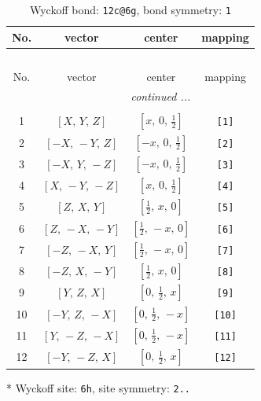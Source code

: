 \documentclass[fleqn,8pt]{jsarticle}
\begin{document}
\begin{longtable}{cccc}
\caption{Wyckoff bond: {\tt 12c@6g}, bond symmetry: {\tt 1}}
 \\
 \hline \hline
No. & vector & center & mapping \\ \hline \endfirsthead

\multicolumn{3}{l}{\tablename\ \thetable{}} \\
 \hline \hline
No. & vector & center & mapping \\ \hline \endhead

 \hline \hline
\multicolumn{3}{r}{\footnotesize\it continued ...} \\ \endfoot

 \hline \hline
\multicolumn{3}{r}{} \\ \endlastfoot

1 & $\left[ X,\, Y,\, Z \right]$ & $\left[ x,\, 0,\, \frac{1}{2} \right]$ & {\tt [1]} \\ \hline
2 & $\left[ - X,\, - Y,\, Z \right]$ & $\left[ - x,\, 0,\, \frac{1}{2} \right]$ & {\tt [2]} \\ \hline
3 & $\left[ - X,\, Y,\, - Z \right]$ & $\left[ - x,\, 0,\, \frac{1}{2} \right]$ & {\tt [3]} \\ \hline
4 & $\left[ X,\, - Y,\, - Z \right]$ & $\left[ x,\, 0,\, \frac{1}{2} \right]$ & {\tt [4]} \\ \hline
5 & $\left[ Z,\, X,\, Y \right]$ & $\left[ \frac{1}{2},\, x,\, 0 \right]$ & {\tt [5]} \\ \hline
6 & $\left[ Z,\, - X,\, - Y \right]$ & $\left[ \frac{1}{2},\, - x,\, 0 \right]$ & {\tt [6]} \\ \hline
7 & $\left[ - Z,\, - X,\, Y \right]$ & $\left[ \frac{1}{2},\, - x,\, 0 \right]$ & {\tt [7]} \\ \hline
8 & $\left[ - Z,\, X,\, - Y \right]$ & $\left[ \frac{1}{2},\, x,\, 0 \right]$ & {\tt [8]} \\ \hline
9 & $\left[ Y,\, Z,\, X \right]$ & $\left[ 0,\, \frac{1}{2},\, x \right]$ & {\tt [9]} \\ \hline
10 & $\left[ - Y,\, Z,\, - X \right]$ & $\left[ 0,\, \frac{1}{2},\, - x \right]$ & {\tt [10]} \\ \hline
11 & $\left[ Y,\, - Z,\, - X \right]$ & $\left[ 0,\, \frac{1}{2},\, - x \right]$ & {\tt [11]} \\ \hline
12 & $\left[ - Y,\, - Z,\, X \right]$ & $\left[ 0,\, \frac{1}{2},\, x \right]$ & {\tt [12]} \\
\end{longtable}
* Wyckoff site: {\tt 6h}, site symmetry: {\tt 2..}
\end{document}
